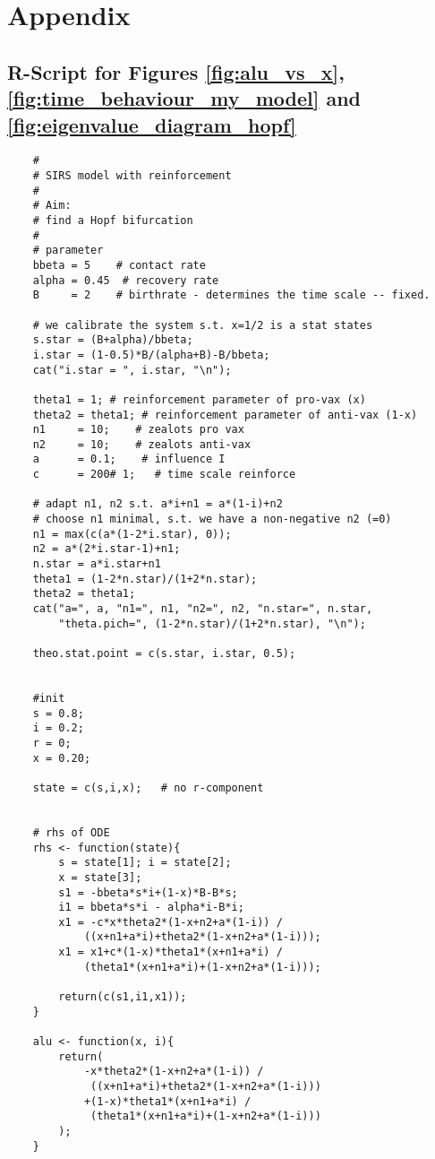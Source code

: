 \newpage

\section{Appendix}

	\subsection{R-Script for Figures \ref{fig:alu_vs_x}, \ref{fig:time_behaviour_my_model} and \ref{fig:eigenvalue_diagram_hopf}}\label{app:first}
	
	\begin{lstlisting}
	#
	# SIRS model with reinforcement
	#
	# Aim:
	# find a Hopf bifurcation
	#
	# parameter
	bbeta = 5    # contact rate
	alpha = 0.45  # recovery rate
	B     = 2    # birthrate - determines the time scale -- fixed.
		
	# we calibrate the system s.t. x=1/2 is a stat states
	s.star = (B+alpha)/bbeta;
	i.star = (1-0.5)*B/(alpha+B)-B/bbeta;
	cat("i.star = ", i.star, "\n");
		
	theta1 = 1; # reinforcement parameter of pro-vax (x)
	theta2 = theta1; # reinforcement parameter of anti-vax (1-x)
	n1     = 10;    # zealots pro vax
	n2     = 10;    # zealots anti-vax
	a      = 0.1;    # influence I
	c      = 200# 1;   # time scale reinforce
		
	# adapt n1, n2 s.t. a*i+n1 = a*(1-i)+n2
	# choose n1 minimal, s.t. we have a non-negative n2 (=0)
	n1 = max(c(a*(1-2*i.star), 0));
	n2 = a*(2*i.star-1)+n1;
	n.star = a*i.star+n1
	theta1 = (1-2*n.star)/(1+2*n.star);
	theta2 = theta1;
	cat("a=", a, "n1=", n1, "n2=", n2, "n.star=", n.star, 
		"theta.pich=", (1-2*n.star)/(1+2*n.star), "\n"); 
		
	theo.stat.point = c(s.star, i.star, 0.5);
		
		
	#init
	s = 0.8;
	i = 0.2;
	r = 0;
	x = 0.20;
		
	state = c(s,i,x);   # no r-component
	
	
	# rhs of ODE
	rhs <- function(state){
		s = state[1]; i = state[2]; 
		x = state[3];
		s1 = -bbeta*s*i+(1-x)*B-B*s;
		i1 = bbeta*s*i - alpha*i-B*i;
		x1 = -c*x*theta2*(1-x+n2+a*(1-i)) /
			((x+n1+a*i)+theta2*(1-x+n2+a*(1-i)));
		x1 = x1+c*(1-x)*theta1*(x+n1+a*i) / 
			(theta1*(x+n1+a*i)+(1-x+n2+a*(1-i)));
				
		return(c(s1,i1,x1));
	}
		
	alu <- function(x, i){
		return(
			-x*theta2*(1-x+n2+a*(1-i)) /
			 ((x+n1+a*i)+theta2*(1-x+n2+a*(1-i)))
			+(1-x)*theta1*(x+n1+a*i) /
			 (theta1*(x+n1+a*i)+(1-x+n2+a*(1-i)))
		);
	}
		

\end{lstlisting}
